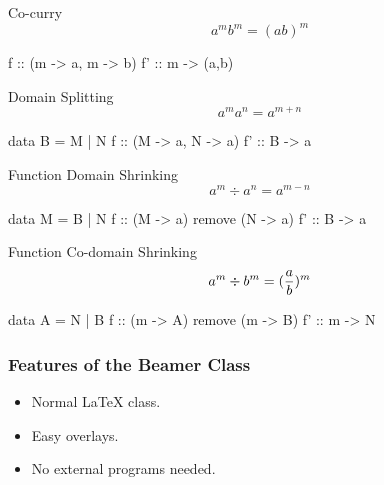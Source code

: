 \documentclass{beamer}
\begin{document}
\begin{frame}[fragile]
Co-curry
$$ a^{m}b^{m} = (ab)^{m}$$

\begin{code}
f :: (m -> a, m -> b)
f' :: m -> (a,b)
\end{code}
\end{frame}

\begin{frame}[fragile]
Domain Splitting
$$a^{m}a^{n} = a^{m+n}$$
\begin{code}
data B = M | N
f :: (M -> a, N -> a)
f' :: B -> a
\end{code}
\end{frame}

\begin{frame}[fragile]
Function Domain Shrinking
$$ a^{m} \div a^{n} = a^{m-n}$$
\begin{code}
data M = B | N
f :: (M -> a) remove (N -> a)
f' :: B -> a
\end{code}
\end{frame}

\begin{frame}[fragile]
Function Co-domain Shrinking
$$ a^{m} \div b^{m} = ({a \over b})^{m}$$
\begin{code}
data A = N | B
f :: (m -> A) remove (m -> B)
f' :: m -> N
\end{code}
\end{frame}





\frame
{
  \frametitle{Features of the Beamer Class}

  \begin{itemize}
  \item<1-> Normal LaTeX class.
  \item<2-> Easy overlays.
  \item<3-> No external programs needed.      
  \end{itemize}
}
\end{document}
